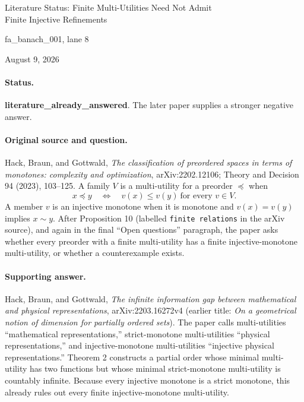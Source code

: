 \documentclass[10pt]{article}
\begin{document}
\begin{center}
{\Large Literature Status: Finite Multi-Utilities Need Not Admit\\Finite Injective Refinements\par}
\vspace{0.6em}
{fa\_banach\_001, lane 8\par}
\vspace{0.25em}
{August 9, 2026\par}
\end{center}
\vspace{0.7em}

\paragraph{Status.}
\textbf{literature\_already\_answered}. The later paper supplies a stronger negative answer.

\paragraph{Original source and question.}
Hack, Braun, and Gottwald, \emph{The classification of preordered spaces in terms of monotones: complexity and optimization}, arXiv:2202.12106; Theory and Decision 94 (2023), 103--125. A family $V$ is a multi-utility for a preorder $\preceq$ when
\[
 x\preceq y \quad\Longleftrightarrow\quad v(x)\leq v(y)\ \text{for every }v\in V.
\]
A member $v$ is an injective monotone when it is monotone and $v(x)=v(y)$ implies $x\sim y$. After Proposition 10 (labelled \texttt{finite relations} in the arXiv source), and again in the final ``Open questions'' paragraph, the paper asks whether every preorder with a finite multi-utility has a finite injective-monotone multi-utility, or whether a counterexample exists.

\paragraph{Supporting answer.}
Hack, Braun, and Gottwald, \emph{The infinite information gap between mathematical and physical representations}, arXiv:2203.16272v4 (earlier title: \emph{On a geometrical notion of dimension for partially ordered sets}). The paper calls multi-utilities ``mathematical representations,'' strict-monotone multi-utilities ``physical representations,'' and injective-monotone multi-utilities ``injective physical representations.'' Theorem 2 constructs a partial order whose minimal multi-utility has two functions but whose minimal strict-monotone multi-utility is countably infinite. Because every injective monotone is a strict monotone, this already rules out every finite injective-monotone multi-utility.
\end{document}
